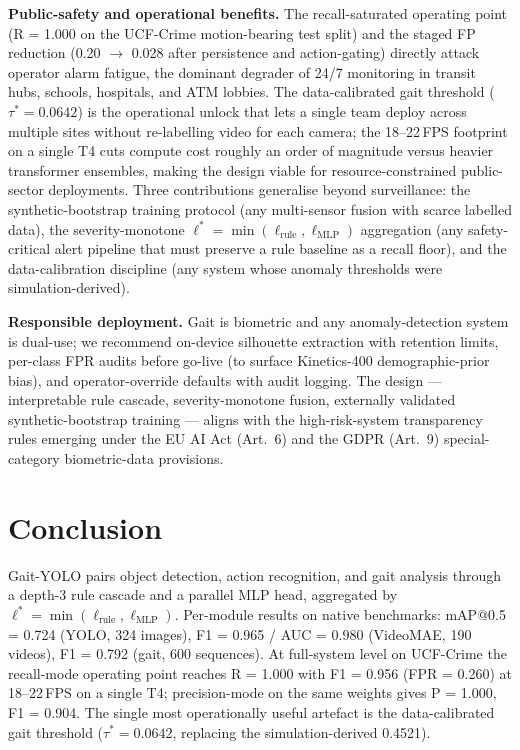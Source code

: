 \documentclass[runningheads]{llncs}
\begin{document}
\textbf{Public-safety and operational benefits.} The recall-saturated operating point (R = 1.000 on the UCF-Crime motion-bearing test split) and the staged FP reduction (0.20 $\to$ 0.028 after persistence and action-gating) directly attack operator alarm fatigue, the dominant degrader of 24/7 monitoring in transit hubs, schools, hospitals, and ATM lobbies. The data-calibrated gait threshold ($\tau^* = 0.0642$) is the operational unlock that lets a single team deploy across multiple sites without re-labelling video for each camera; the 18--22\,FPS footprint on a single T4 cuts compute cost roughly an order of magnitude versus heavier transformer ensembles, making the design viable for resource-constrained public-sector deployments. Three contributions generalise beyond surveillance: the synthetic-bootstrap training protocol (any multi-sensor fusion with scarce labelled data), the severity-monotone $\ell^*\!=\!\min(\ell_\text{rule},\ell_\text{MLP})$ aggregation (any safety-critical alert pipeline that must preserve a rule baseline as a recall floor), and the data-calibration discipline (any system whose anomaly thresholds were simulation-derived).

\textbf{Responsible deployment.} Gait is biometric and any anomaly-detection system is dual-use; we recommend on-device silhouette extraction with retention limits, per-class FPR audits before go-live (to surface Kinetics-400 demographic-prior bias), and operator-override defaults with audit logging. The design --- interpretable rule cascade, severity-monotone fusion, externally validated synthetic-bootstrap training --- aligns with the high-risk-system transparency rules emerging under the EU AI Act (Art.~6) and the GDPR (Art.~9) special-category biometric-data provisions.

\section{Conclusion}\label{sec:conc}

Gait-YOLO pairs object detection, action recognition, and gait analysis through a depth-3 rule cascade and a parallel MLP head, aggregated by $\ell^*\!=\!\min(\ell_\text{rule},\ell_\text{MLP})$. Per-module results on native benchmarks: mAP@0.5 = 0.724 (YOLO, 324 images), F1 = 0.965 / AUC = 0.980 (VideoMAE, 190 videos), F1 = 0.792 (gait, 600 sequences). At full-system level on UCF-Crime the recall-mode operating point reaches R = 1.000 with F1 = 0.956 (FPR = 0.260) at 18--22\,FPS on a single T4; precision-mode on the same weights gives P = 1.000, F1 = 0.904. The single most operationally useful artefact is the data-calibrated gait threshold ($\tau^* = 0.0642$, replacing the simulation-derived 0.4521).
\end{document}
